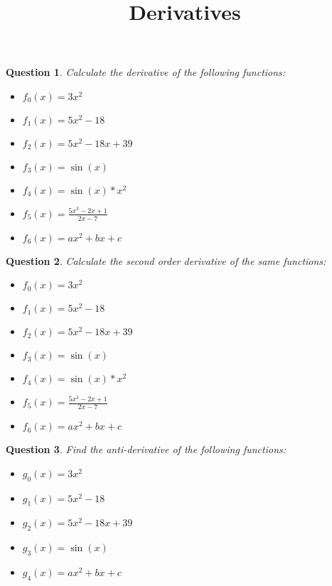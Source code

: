 \documentclass[]{article}
\title{Derivatives}
\author{}
\date{}
\newtheorem{question}{Question}
\begin{document}
	
	\maketitle
	
	
	\begin{question}
		Calculate the derivative of the following functions:\\
		\begin{itemize}
			\item $f_0(x) = 3x^2$
			\item $f_1(x) = 5x^2-18$
			\item $f_2(x) = 5x^2-18x+39$
			\item $f_3(x) = \sin(x)$
			\item $f_4(x) = \sin(x)*x^2$
			\item $f_5(x) = \frac{5x^3-2x+1}{2x-7}$
			\item $f_6(x) = ax^2+bx+c$
		\end{itemize}
	\end{question}
	
	\begin{question}
		Calculate the second order derivative of the same functions:\\
		\begin{itemize}
			\item $f_0(x) = 3x^2$
			\item $f_1(x) = 5x^2-18$
			\item $f_2(x) = 5x^2-18x+39$
			\item $f_3(x) = \sin(x)$
			\item $f_4(x) = \sin(x)*x^2$
			\item $f_5(x) = \frac{5x^3-2x+1}{2x-7}$
			\item $f_6(x) = ax^2+bx+c$
		\end{itemize}
	\end{question}
	
	\begin{question}
		Find the anti-derivative of the following functions:\\
		\begin{itemize}
			\item $g_0(x) = 3x^2$
			\item $g_1(x) = 5x^2-18$
			\item $g_2(x) = 5x^2-18x+39$
			\item $g_3(x) = \sin(x)$
			\item $g_4(x) = ax^2+bx+c$
		\end{itemize}
	\end{question}
	
\end{document}
